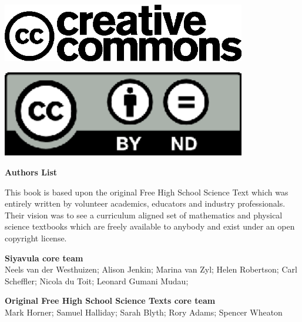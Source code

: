 \vspace*{4in}

\begin{center}
\begin{minipage}{0.6\textwidth}
\includegraphics[width=0.8\textwidth]{title_images/cc2.eps}
\end{minipage}
\begin{minipage}{0.3\textwidth}
\includegraphics[width=0.8\textwidth]{title_images/cc1.eps}
\end{minipage}
\end{center}

\newpage
\thispagestyle{empty}


\begin{flushleft} \textbf{\huge Authors List} \end{flushleft}

{\LARGE This book is based upon the original Free High School Science Text which was entirely written by
volunteer academics, educators and industry professionals. Their vision was to see a curriculum aligned
set of mathematics and physical science textbooks which are freely available to anybody and exist
under an open copyright license.} \par

\textbf{\LARGE Siyavula core team} \\

Neels van der Westhuizen; Alison Jenkin; Marina van Zyl; Helen Robertson; Carl Scheffler; Nicola du Toit; Leonard Gumani Mudau; \par

\textbf{\LARGE Original Free High School Science Texts core team}\\

Mark Horner; Samuel Halliday; Sarah Blyth; Rory Adams; Spencer Wheaton \par 



